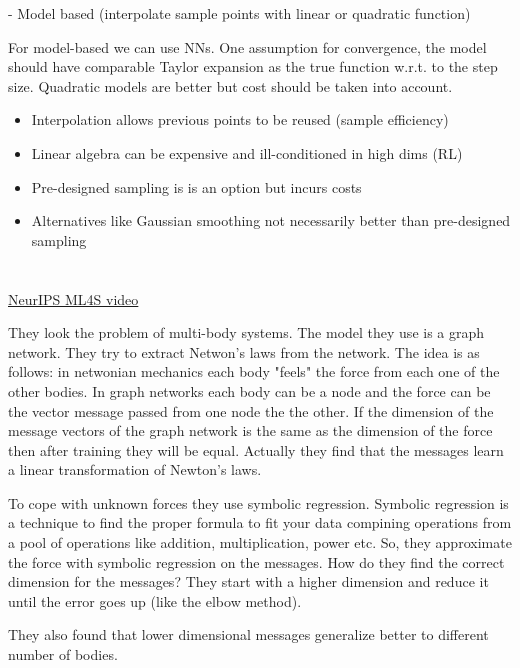 \documentclass{article}
\newcommand{\citeall}[1]{\citeauthor{#1}}
\newcommand{\uls}{\begin{itemize}}
\newcommand{\ule}{\end{itemize}}
\newcommand{\li}{\item}
\begin{document}
- Model based (interpolate sample points with linear or quadratic function)

For model-based we can use NNs. One assumption for convergence, the model should have comparable Taylor expansion as the true function w.r.t. to the step size. Quadratic models are better but cost should be taken into account. 

\uls
\li Interpolation allows previous points to be reused (sample efficiency)
\li Linear algebra can be expensive and ill-conditioned in high dims (RL)
\li Pre-designed sampling is is an option but incurs costs
\li Alternatives like Gaussian smoothing not necessarily better than pre-designed sampling
\ule

\section{\citeall{Cranmer2019LearningNetworks}}
\href{https://slideslive.com/38922576/learning-symbolic-physics-with-graph-networks}{NeurIPS ML4S video}

They look the problem of multi-body systems. The model they use is a graph network. They try to extract Netwon's laws from the network. The idea is as follows: in netwonian mechanics each body "feels" the force from each one of the other bodies. In graph networks each body can be a node and the force can be the vector message passed from one node the the other. If the dimension of the message vectors of the graph network is the same as the dimension of the force then after training they will be equal. Actually they find that the messages learn a linear transformation of Newton's laws.

To cope with unknown forces they use symbolic regression. Symbolic regression is a technique to find the proper formula to fit your data compining operations from a pool of operations like addition, multiplication, power etc. So, they approximate the force with symbolic regression on the messages. How do they find the correct dimension for the messages? They start with a higher dimension and reduce it until the error goes up (like the elbow method). 

They also found that lower dimensional messages generalize better to different number of bodies. 

\section{\citeall{Cranmer2019TheInference}}
\end{document}
